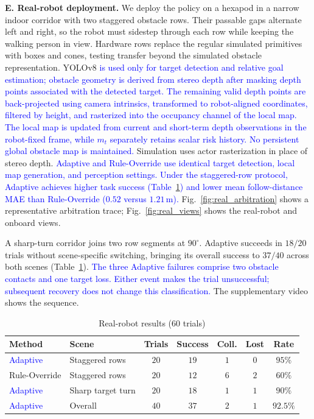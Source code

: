 \documentclass[letterpaper, 10 pt, conference]{ieeeconf}
\newcommand{\rev}[1]{\textcolor{blue}{#1}}
\begin{document}
\textbf{E. Real-robot deployment.}
We deploy the policy on a hexapod in a narrow indoor corridor with two
staggered obstacle rows. Their passable gaps alternate left and right, so the
robot must sidestep through each row while keeping the walking person in view. Hardware rows replace the regular
simulated primitives with boxes and cones, testing transfer beyond
the simulated obstacle representation.
YOLOv8 \rev{is used only for target detection and relative goal estimation; obstacle geometry is derived from stereo depth after masking depth points associated with the detected target. The remaining valid depth points are back-projected using camera intrinsics, transformed to robot-aligned coordinates, filtered by height, and rasterized into the occupancy channel of the local map. The local map is updated from current and short-term depth observations in the robot-fixed frame, while $m_t$ separately retains scalar risk history. No persistent global obstacle map is maintained.} Simulation uses actor rasterization in place of stereo depth.
\rev{Adaptive and Rule-Override use identical target detection, local map generation, and perception settings.} \rev{Under the staggered-row protocol, Adaptive achieves higher task success (Table~\ref{tab:real}) and lower mean follow-distance MAE than Rule-Override ($0.52$ versus $1.21\,\mathrm{m}$).}
Fig.~\ref{fig:real_arbitration} shows a representative arbitration trace; Fig.~\ref{fig:real_views} shows the real-robot and onboard views.

A sharp-turn corridor joins two row segments at $90^\circ$. Adaptive succeeds in $18/20$ trials without scene-specific switching, bringing its overall success to $37/40$ across both scenes (Table~\ref{tab:real}). \rev{The three Adaptive failures comprise two obstacle contacts and one target loss. Either event makes the trial unsuccessful; subsequent recovery does not change this classification.} The supplementary video shows the sequence.

\begin{table}[t]
\centering
\caption{Real-robot results (60 trials)}
\label{tab:real}
\footnotesize
\setlength{\tabcolsep}{3pt}
\begin{tabular*}{\columnwidth}{@{\extracolsep{\fill}}llccccc@{}}
\toprule
Method & Scene & Trials & Success & Coll. & Lost & Rate \\
\midrule
\rev{Adaptive} & Staggered rows & $20$ & $19$ & $1$ & $0$ & $95\%$ \\
Rule-Override & Staggered rows & $20$ & $12$ & $6$ & $2$ & $60\%$ \\
\rev{Adaptive} & Sharp target turn & $20$ & $18$ & $1$ & $1$ & $90\%$ \\
\rev{Adaptive} & Overall & $40$ & $37$ & $2$ & $1$ & $92.5\%$ \\
\bottomrule
\end{tabular*}
\end{table}
\end{document}
